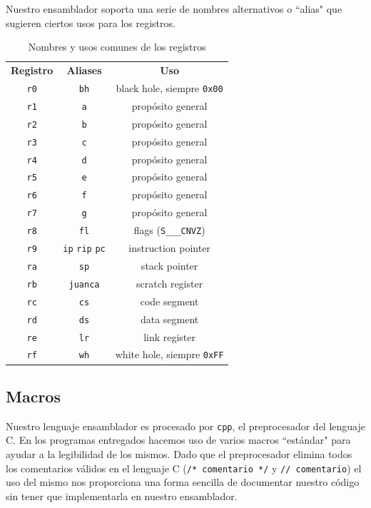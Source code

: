 \documentclass{article}
\begin{document}
Nuestro ensamblador soporta una serie de nombres alternativos o ``alias" que sugieren ciertos usos para los registros.

\begin{table}[h]
    \centering
    \begin{tabular}{c|c|c}
        \textbf{Registro} & \textbf{Aliases} & \textbf{Uso} \\
        \texttt{r0}       & \texttt{bh}      & black hole, siempre \texttt{0x00} \\
        \texttt{r1}       & \texttt{a}       & propósito general \\
        \texttt{r2}       & \texttt{b}       & propósito general \\
        \texttt{r3}       & \texttt{c}       & propósito general \\
        \texttt{r4}       & \texttt{d}       & propósito general \\
        \texttt{r5}       & \texttt{e}       & propósito general \\
        \texttt{r6}       & \texttt{f}       & propósito general \\
        \texttt{r7}       & \texttt{g}       & propósito general \\
        \texttt{r8}       & \texttt{fl}      & flags (\texttt{S\_\_\_CNVZ}) \\
        \texttt{r9}       & \texttt{ip} \texttt{rip} \texttt{pc} 
                                             & instruction pointer \\
        \texttt{ra}       & \texttt{sp}      & stack pointer \\
        \texttt{rb}       & \texttt{juanca}  & scratch register \\
        \texttt{rc}       & \texttt{cs}      & code segment \\
        \texttt{rd}       & \texttt{ds}      & data segment \\
        \texttt{re}       & \texttt{lr}      & link register \\
        \texttt{rf}       & \texttt{wh}      & white hole, siempre \texttt{0xFF} \\
    \end{tabular}
    \caption{Nombres y usos comunes de los registros}
\end{table}

\subsection{Macros}
Nuestro lenguaje ensamblador es procesado por \texttt{cpp}, el preprocesador del lenguaje C. En los programas entregados hacemos uso de varios macros ``estándar" para ayudar a la legibilidad de los mismos. Dado que el preprocesador elimina todos los comentarios válidos en el lenguaje C (\texttt{/* comentario */} y \texttt{// comentario}) el uso del mismo nos proporciona una forma sencilla de documentar nuestro código sin tener que implementarla en nuestro ensamblador.
\end{document}
